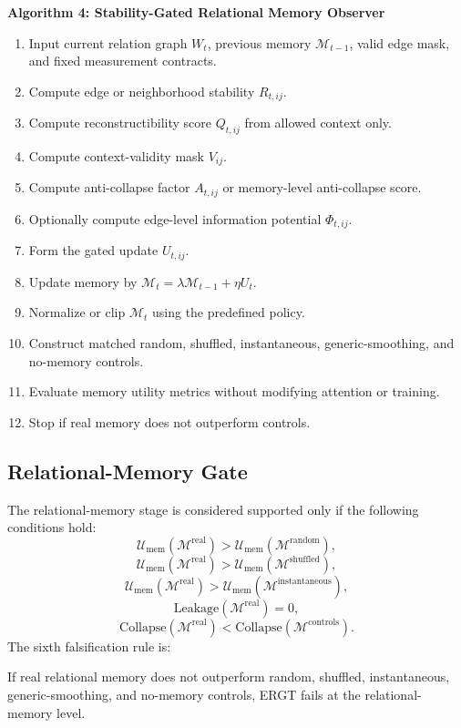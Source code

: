 \documentclass[11pt]{article}
\begin{document}
\noindent\textbf{Algorithm 4: Stability-Gated Relational Memory Observer}

\begin{enumerate}[label=\arabic*.]
    \item Input current relation graph $W_t$, previous memory $\mathcal{M}_{t-1}$, valid edge mask, and fixed measurement contracts.
    \item Compute edge or neighborhood stability $R_{t,ij}$.
    \item Compute reconstructibility score $Q_{t,ij}$ from allowed context only.
    \item Compute context-validity mask $V_{ij}$.
    \item Compute anti-collapse factor $A_{t,ij}$ or memory-level anti-collapse score.
    \item Optionally compute edge-level information potential $\Phi_{t,ij}$.
    \item Form the gated update $U_{t,ij}$.
    \item Update memory by $\mathcal{M}_t=\lambda\mathcal{M}_{t-1}+\eta U_t$.
    \item Normalize or clip $\mathcal{M}_t$ using the predefined policy.
    \item Construct matched random, shuffled, instantaneous, generic-smoothing, and no-memory controls.
    \item Evaluate memory utility metrics without modifying attention or training.
    \item Stop if real memory does not outperform controls.
\end{enumerate}

\subsection{Relational-Memory Gate}

The relational-memory stage is considered supported only if the following conditions hold:
\[
\mathcal{U}_{\mathrm{mem}}(\mathcal{M}^{\mathrm{real}})>
\mathcal{U}_{\mathrm{mem}}(\mathcal{M}^{\mathrm{random}}),
\]
\[
\mathcal{U}_{\mathrm{mem}}(\mathcal{M}^{\mathrm{real}})>
\mathcal{U}_{\mathrm{mem}}(\mathcal{M}^{\mathrm{shuffled}}),
\]
\[
\mathcal{U}_{\mathrm{mem}}(\mathcal{M}^{\mathrm{real}})>
\mathcal{U}_{\mathrm{mem}}(\mathcal{M}^{\mathrm{instantaneous}}),
\]
\[
\mathrm{Leakage}(\mathcal{M}^{\mathrm{real}})=0,
\]
\[
\mathrm{Collapse}(\mathcal{M}^{\mathrm{real}})<\mathrm{Collapse}(\mathcal{M}^{\mathrm{controls}}).
\]
The sixth falsification rule is:
\begin{ergtclaim}
If real relational memory does not outperform random, shuffled, instantaneous, generic-smoothing, and no-memory controls, ERGT fails at the relational-memory level.
\end{ergtclaim}
\end{document}
